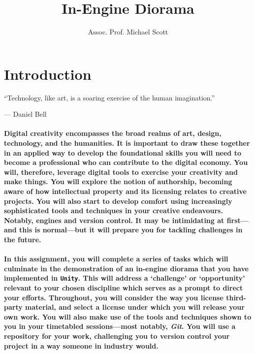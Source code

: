 \documentclass{../../fal_assignment}
\title{In-Engine Diorama}
\author{Assoc. Prof. Michael Scott}
\begin{document}
\maketitle

\vspace{-1em}

\section*{Introduction}

\begin{marginquote}
``Technology, like art, is a soaring exercise of the human imagination.''

--- Daniel Bell 
\end{marginquote}

\paragraph{Digital creativity encompasses the broad realms of art, design, technology, and the humanities. It is important to draw these together in an applied way to develop the foundational skills you will need to become a professional who can contribute to the digital economy. You will, therefore, leverage digital tools to exercise your creativity and make things. You will explore the notion of authorship, becoming aware of how intellectual property and its licensing relates to creative projects. You will also start to develop comfort using increasingly sophisticated tools and techniques in your creative endeavours. Notably, engines and version control. It may be intimidating at first---and this is normal---but it will prepare you for tackling challenges in the future.}

\paragraph{In this assignment, you will complete a series of tasks which will culminate in the demonstration of an in-engine diorama that you have implemented in \texttt{Unity}. This will address a `challenge' or `opportunity' relevant to your chosen discipline which serves as a prompt to direct your efforts. Throughout, you will consider the way you license third-party material, and select a license under which you will release your own work. You will also make use of the tools and techniques shown to you in your timetabled sessions---most notably, \textit{Git}. You will use a repository for your work, challenging you to version control your project in a way someone in industry would.}
\end{document}
